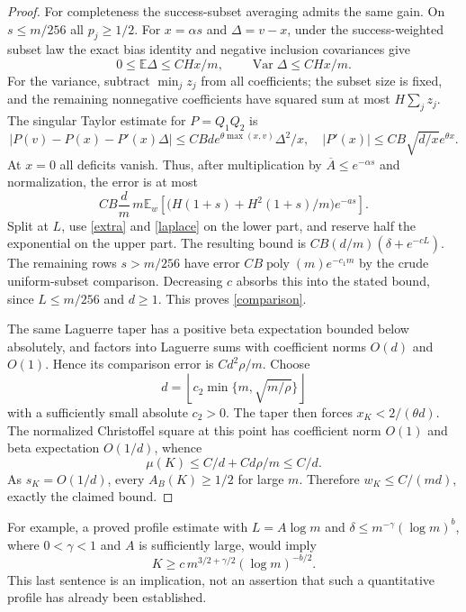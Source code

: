 \documentclass[11pt]{article}
\newcommand{\E}{\mathbb E}
\begin{document}
\begin{proof}
For completeness the success-subset averaging admits the same gain.
On $s\le m/256$ all $p_j\ge1/2$. For $x=\alpha s$ and
$\Delta=v-x$, under the success-weighted subset law the exact bias
identity and negative inclusion covariances give
\[
 0\le\E\Delta\le CHx/m,
 \qquad \operatorname{Var}\Delta\le CHx/m.
\]
For the variance, subtract $\min_j z_j$ from all coefficients; the
subset size is fixed, and the remaining nonnegative coefficients
have squared sum at most $H\sum_jz_j$.
The singular Taylor estimate for $P=Q_1Q_2$ is
\[
 |P(v)-P(x)-P'(x)\Delta|
 \le CBd e^{\theta\max(x,v)}\Delta^2/x,
 \quad |P'(x)|\le CB\sqrt{d/x}e^{\theta x}.
\]
At $x=0$ all deficits vanish. Thus, after multiplication by
$\overline A\le e^{-\alpha s}$ and normalization, the error is at most
\[
 CB\frac d m\,m\E_w\left[
  \bigl(H(1+s)+H^2(1+s)/m\bigr)e^{-as}\right].
\]
Split at $L$, use \eqref{extra} and \eqref{laplace} on the lower
part, and reserve half the exponential on the upper part.
The resulting bound is $CB(d/m)(\delta+e^{-cL})$.
The remaining rows $s>m/256$ have error $CB\operatorname{poly}(m)e^{-c_1m}$
by the crude uniform-subset comparison. Decreasing $c$ absorbs this
into the stated bound, since $L\le m/256$ and $d\ge1$.
This proves \eqref{comparison}.

The same Laguerre taper has a positive beta expectation bounded
below absolutely, and factors into Laguerre sums with coefficient
norms $O(d)$ and $O(1)$. Hence its comparison error is
$Cd^2\rho/m$. Choose
\[
 d=\left\lfloor c_2\min\{m,\sqrt{m/\rho}\}\right\rfloor
\]
with a sufficiently small absolute $c_2>0$. The taper then forces
$x_K<2/(\theta d)$. The normalized Christoffel square at this point
has coefficient norm $O(1)$ and beta expectation $O(1/d)$, whence
\[
 \mu(K)\le C/d+Cd\rho/m\le C/d.
\]
As $s_K=O(1/d)$, every $A_B(K)\ge1/2$ for large $m$. Therefore
$w_K\le C/(md)$, exactly the claimed bound.
\end{proof}

For example, a proved profile estimate with
$L=A\log m$ and $\delta\le m^{-\gamma}(\log m)^b$, where
$0<\gamma<1$ and $A$ is sufficiently large, would imply
\[
 K\ge c\,m^{3/2+\gamma/2}(\log m)^{-b/2}.
\]
This last sentence is an implication, not an assertion that such a
quantitative profile has already been established.
\end{document}
